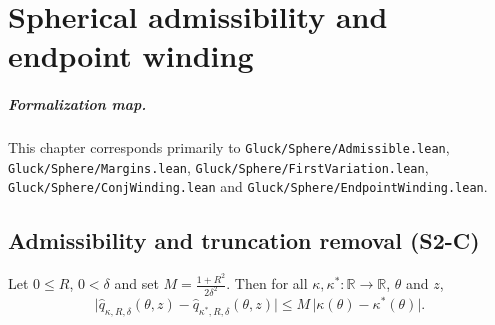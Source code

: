 \chapter{Spherical admissibility and endpoint winding}
\label{chap:sphere_winding}


\paragraph{Formalization map.}
This chapter corresponds primarily to \texttt{Gluck/Sphere/Admissible.lean}, \texttt{Gluck/Sphere/Margins.lean}, \texttt{Gluck/Sphere/FirstVariation.lean}, \texttt{Gluck/Sphere/ConjWinding.lean} and \texttt{Gluck/Sphere/EndpointWinding.lean}.

\section{Admissibility and truncation removal (S2-C)}
\label{sec:sphere_admissible}

\begin{lemma}
  \label{lem:truncated_speed_sub_le}
  Let $0\le R$, $0<\delta$ and set $M=\tfrac{1+R^2}{2\delta^2}$. Then for all
  $\kappa,\kappa^\ast:\mathbb R\to\mathbb R$, $\theta$ and $z$,
  \[
    \bigl|\hat q_{\kappa,R,\delta}(\theta,z)-\hat q_{\kappa^\ast,R,\delta}(\theta,z)\bigr|
    \le M\,\bigl|\kappa(\theta)-\kappa^\ast(\theta)\bigr| .
  \]
\end{lemma}

